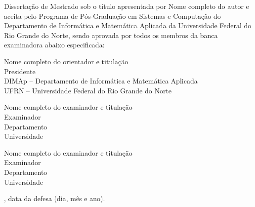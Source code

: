 \begin{folhadeaprovacao}
	\setlength{\ABNTsignthickness}{0.4pt}
	\setlength{\ABNTsignwidth}{10cm}
	
	\noindent 
	Dissertação de Mestrado sob o título \textit{\mscThesisTitle} apresentada por Nome completo do autor e aceita pelo Programa de Pós-Graduação em Sistemas e Computação do Departamento de Informática e Matemática Aplicada da Universidade Federal do Rio Grande do Norte, sendo aprovada por todos os membros da banca examinadora abaixo especificada:
		
	\assinatura
	{
		Nome completo do orientador e titulação   			                  \\
		{\small Presidente}											          \smallskip\\ 
		{\footnotesize
			DIMAp -- Departamento de Informática e Matemática Aplicada		   \\
		  	UFRN -- Universidade Federal do Rio Grande do Norte
		}
   }
      
   \assinatura
	{
      Nome completo do examinador e titulação   			                  \\
		{\small Examinador}											          \smallskip\\ 
		{\footnotesize
			Departamento		\\
		  	Universidade
		}
   }   
   
   \assinatura
	{
      Nome completo do examinador e titulação   			                  \\
		{\small Examinador}											          \smallskip\\ 
		{\footnotesize
			Departamento		\\
		  	Universidade
		}
	}
		
	\vfill
	
	\begin{center}
		{\city}, data da defesa (dia, mês e ano).
	\end{center}
\end{folhadeaprovacao}
